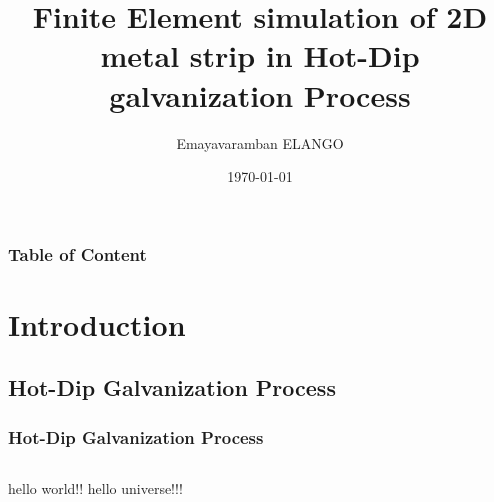 \documentclass[9pt]{beamer}
\title{Finite Element simulation of 2D metal strip in Hot-Dip galvanization Process}
\author{Emayavaramban ELANGO}
\institute{\'Ecole centrale De Nantes}
\date{\today}
\begin{document}

\frame{\titlepage}


\begin{frame}
\frametitle{Table of Content}
\tableofcontents
\end{frame}
\section{Introduction}

\subsection{Hot-Dip Galvanization Process}
\begin{frame}
\frametitle{Hot-Dip Galvanization Process}



\begin{columns}
hello world!!
hello universe!!!
\end{columns}

\end{frame}
\end{document}
